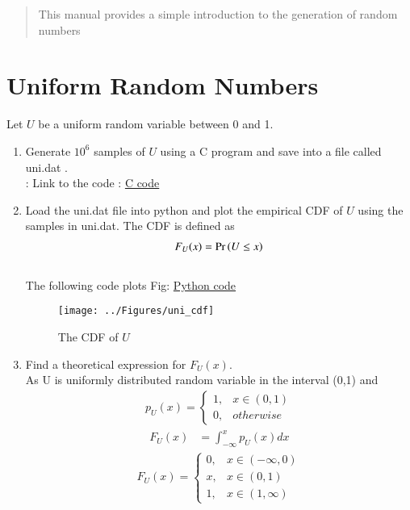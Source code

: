 \documentclass[journal,12pt,twocolumn]{IEEEtran}
\renewcommand\thesection{\arabic{section}}
\begin{document}
\author{Aniket Tukaram Satpute}

\begin{abstract}
This manual provides a simple introduction to the generation of random numbers
\end{abstract}
\section{Uniform Random Numbers}
Let $U$ be a uniform random variable between 0 and 1.
\begin{enumerate}[label=\thesection.\arabic*
,ref=\thesection.\theenumi]
\item Generate $10^6$ samples of $U$ using a C program and save into a file called uni.dat .
\\
\solution : Link to the code : \href{https://github.com/anikettsatpute/Probability-and-Random-Variable-Assignment/blob/main/code/code1_1.c}{C code}
%
\vspace{0.2in}
\item
Load the uni.dat file into python and plot the empirical CDF of $U$ using the samples in uni.dat. The CDF is defined as
\begin{align}
F_{U}(x) = \Pr\left(U \le x\right)
\end{align}
\\
\solution  The following code plots Fig: \href{https://github.com/anikettsatpute/Probability-and-Random-Variable-Assignment/blob/main/code/code1_2.py}{Python code} 
\begin{figure}[h]
\texttt{[image: ../Figures/uni\_cdf]}
\caption{The CDF of $U$}
\label{fig:uni_cdf}
\end{figure}
%
\item
Find a  theoretical expression for $F_{U}(x)$.\\
\solution As U is uniformly distributed random variable in the interval (0,1) and
\begin{align}
p_U(x) = 
\begin{cases}
1, & x \in (0, 1) \\
0, & otherwise
\end{cases}
\end{align}
\begin{align}
F_U(x) &= \int_{-\infty}^{x} p_U(x)dx
\end{align}
\begin{align}
F_U(x) = 
\begin{cases}
0, & x \in (-\infty,0) \\
x, & x \in (0,1)\\
1, & x \in (1,\infty)
\end{cases}
\end{align}


\end{enumerate}
\end{document}
